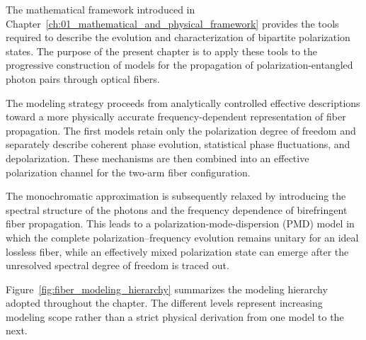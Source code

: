
The mathematical framework introduced in
Chapter~\ref{ch:01_mathematical_and_physical_framework}
provides the tools required to describe the evolution and characterization of
bipartite polarization states. The purpose of the present chapter is to apply
these tools to the progressive construction of models for the propagation of
polarization-entangled photon pairs through optical fibers.

The modeling strategy proceeds from analytically controlled effective
descriptions toward a more physically accurate frequency-dependent representation of fiber
propagation. The first models retain only the polarization degree of freedom and
separately describe coherent phase evolution, statistical phase fluctuations,
and depolarization. These mechanisms are then combined into an effective
polarization channel for the two-arm fiber configuration.

The monochromatic approximation is subsequently relaxed by introducing the
spectral structure of the photons and the frequency dependence of birefringent
fiber propagation. This leads to a polarization-mode-dispersion (PMD) model in
which the complete polarization--frequency evolution remains unitary for an ideal
lossless fiber, while an effectively mixed polarization state can emerge after
the unresolved spectral degree of freedom is traced out.

Figure~\ref{fig:fiber_modeling_hierarchy} summarizes the modeling hierarchy
adopted throughout the chapter. The different levels represent increasing
modeling scope rather than a strict physical derivation from one model to the
next.

